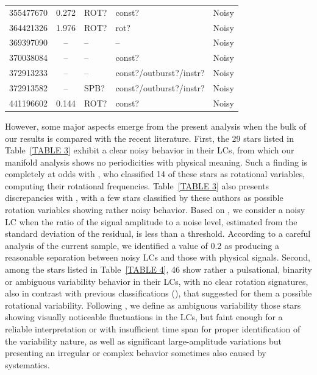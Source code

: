 \documentclass[RNAAS]{aastex63}
\begin{document}
\begin{table}[h]
\begin{tabular}{rclll}
355477670	&	0.272	& ROT?&	const?	&		Noisy\\
364421326	&	1.976	&ROT?&	rot?	&		Noisy\\
369397090	&	--	&  -- &	--	&	Noisy	\\
370038084	&	--	& -- &	const?	&		Noisy\\
372913233	&	--	&  -- &	const?/outburst?/instr?	&	Noisy	\\
372913582	&	--	& 	SPB?&const?/outburst?/instr?	&	Noisy	\\
441196602	&	0.144	&ROT?&	const?	&	Noisy	\\
\hline \hline                                            	  
    \end{tabular}
\end{table}

However, some major aspects emerge from the present analysis when the bulk of our results is compared with the recent literature. First, the 29 stars listed in Table~\ref{TABLE 3} exhibit a clear noisy behavior in their LCs, from which our manifold analysis shows no periodicities with physical meaning. Such a finding is completely at odds with \citet{Balona2019}, who classified 14 of these stars as rotational variables, computing their rotational frequencies. Table~\ref{TABLE 3} also presents discrepancies with \citet{Pedersen2019}, with a few stars classified by these authors as possible rotation variables showing rather noisy behavior. Based on \citet{deMedeiros2013}, we consider a noisy LC when the ratio of the signal amplitude to a noise level, estimated from the standard deviation of the residual, is less than a threshold. According to a careful analysis of the current sample, we identified a value of 0.2 as producing a reasonable separation between noisy LCs and those with physical signals. Second, among the stars listed in Table~\ref{TABLE 4}, 46 show rather a pulsational, binarity or ambiguous variability behavior in their LCs, with no clear rotation signatures, also in contrast with previous classifications (\citealp{Balona2019,Pedersen2019}), that suggested for them a possible rotational variability. Following \citet{Canto2020}, we define as ambiguous variability those stars showing visually noticeable fluctuations in the LCs, but faint enough for a reliable interpretation or with insufficient time span for proper identification of the variability nature, as well as significant large-amplitude variations but presenting an irregular or complex behavior sometimes also caused by systematics. 
\end{document}
